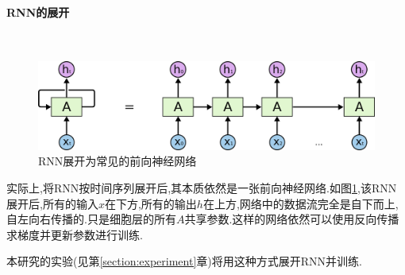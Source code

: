 \paragraph{RNN的展开}\ \par
\begin{figure}[htbp!]
    \centering
    \includegraphics[width = 1.\textwidth]{chap/img/RNN-unrolled.png}
    \caption{
        RNN展开为常见的前向神经网络\supercite{Understanding-LSTMs}
        }\label{fig:rnn_expand}
\end{figure}
\par
实际上,将RNN按时间序列展开后,其本质依然是一张前向神经网络.如图\ref{fig:rnn_expand},该RNN展开后,所有的输入$x$在下方,所有的输出$h$在上方,网络中的数据流完全是自下而上,自左向右传播的.只是细胞层的所有$A$共享参数.这样的网络依然可以使用反向传播求梯度并更新参数进行训练.
\par
本研究的实验(见第\ref{section:experiment}章)将用这种方式展开RNN并训练.
\par


